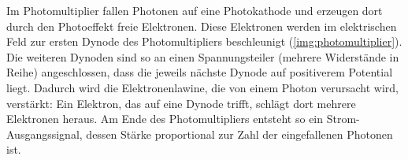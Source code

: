 Im Photomultiplier fallen Photonen auf eine Photokathode und erzeugen dort durch den Photoeffekt freie Elektronen.
Diese Elektronen werden im elektrischen Feld zur ersten Dynode des
Photomultipliers beschleunigt (\autoref{img:photomultiplier}).
Die weiteren Dynoden sind so an einen Spannungsteiler (mehrere Widerstände in Reihe) angeschlossen,
dass die jeweils nächste Dynode auf positiverem Potential liegt.
Dadurch wird die Elektronenlawine, die von einem Photon verursacht wird, verstärkt:
Ein Elektron, das auf eine Dynode trifft, schlägt dort mehrere Elektronen heraus.
Am Ende des Photomultipliers entsteht so ein Strom-Ausgangssignal, dessen Stärke proportional
zur Zahl der eingefallenen Photonen ist.